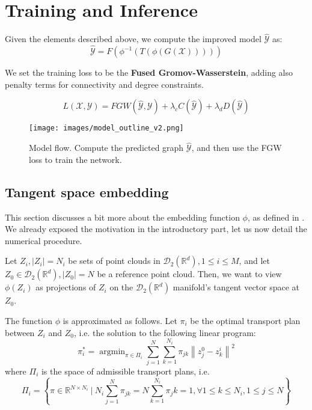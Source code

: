 \documentclass{article}
\newcommand{\norm}[1]{\left\lVert#1\right\rVert}
\DeclareMathOperator*{\argmin}{argmin} %
\begin{document}
\section{Training and Inference}

Given the elements described above, we compute the improved model $\hat{\mathcal{Y}}$ as:
\[\hat{\mathcal{Y}} = F(\phi^{-1}(T(\phi(G(\mathcal{X}))))) \]

We set the training loss to be the \textbf{Fused Gromov-Wasserstein}, adding also penalty terms for connectivity and degree constraints.

\begin{equation}
    \label{eq:loss}
    L(\mathcal{X}, \mathcal{Y}) = FGW(\hat{\mathcal{Y}}, \mathcal{Y}) + \lambda_cC(\hat{\mathcal{Y}}) + \lambda_dD(\hat{\mathcal{Y}})
\end{equation}

\begin{figure}[h!t]
    \label{fig:outline}
    \begin{center}
        \texttt{[image: images/model\_outline\_v2.png]}
        \caption{Model flow. Compute the predicted graph $\hat{\mathcal{Y}}$, and then use the FGW loss to train the network.}
    \end{center}
\end{figure}

\subsection{Tangent space embedding}

This section discusses a bit more about the embedding function $\phi$, as defined in \cite{kolouri2020wasserstein}. We already exposed the motivation in the introductory part, let us now detail the numerical procedure.

Let $Z_i, |Z_i|=N_i$ be sets of point clouds in $\mathscr{D}_2({\mathbb{R}^d}), 1\leq i\leq M$, and let $Z_0\in \mathscr{D}_2({\mathbb{R}^d}), |Z_0| = N$ be a reference point cloud. Then, we want to view $\phi(Z_i)$ as projections of $Z_i$ on the $\mathscr{D}_2({\mathbb{R}^d})$ manifold's tangent vector space at $Z_0$.

The function $\phi$ is approximated as follows. Let $\pi_i$ be the optimal transport plan between $Z_i$ and $Z_0$, i.e. the solution to the following linear program:
\[\pi_i^* = \argmin_{\pi \in \Pi_i}\sum_{j=1}^N\sum_{k=1}^{N_i}\pi_{jk}\norm{z_j^0 - z_k^i}^2 \]
where $\Pi_i$ is the space of admissible transport plans, i.e.
\[\Pi_i = \left\{\pi\in\mathbb{R}^{N\times N_i}\ \bigg|\ N_i\sum_{j=1}^N\pi_{jk} = N\sum_{k=1}^{N_i}\pi_jk = 1, \forall 1\leq k\leq N_i, 1\leq j\leq N \right\} \]
\end{document}
